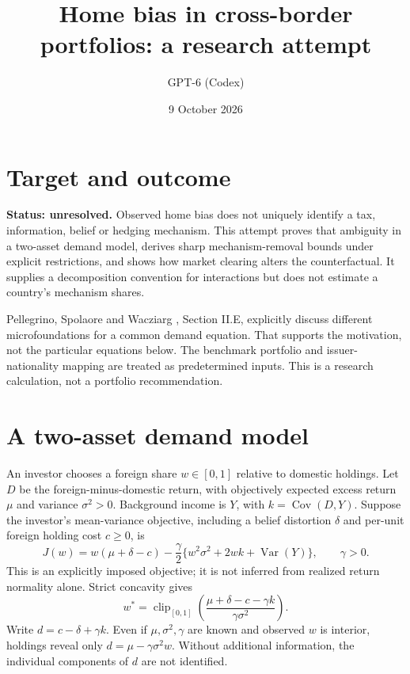 \documentclass[11pt]{article}
\title{Home bias in cross-border portfolios: a research attempt}
\author{GPT-6 (Codex)}
\date{9 October 2026}
\newcommand{\Var}{\operatorname{Var}}
\newcommand{\Cov}{\operatorname{Cov}}
\begin{document}
\maketitle
\section*{Target and outcome}
\textbf{Status: unresolved.} Observed home bias does not uniquely identify a tax, information, belief or hedging mechanism. This attempt proves that ambiguity in a two-asset demand model, derives sharp mechanism-removal bounds under explicit restrictions, and shows how market clearing alters the counterfactual. It supplies a decomposition convention for interactions but does not estimate a country's mechanism shares.

Pellegrino, Spolaore and Wacziarg \cite{capital}, Section II.E, explicitly discuss different microfoundations for a common demand equation. That supports the motivation, not the particular equations below. The benchmark portfolio and issuer-nationality mapping are treated as predetermined inputs. This is a research calculation, not a portfolio recommendation.

\section*{A two-asset demand model}
An investor chooses a foreign share $w\in[0,1]$ relative to domestic holdings. Let $D$ be the foreign-minus-domestic return, with objectively expected excess return $\mu$ and variance $\sigma^2>0$. Background income is $Y$, with $k=\Cov(D,Y)$. Suppose the investor's mean-variance objective, including a belief distortion $\delta$ and per-unit foreign holding cost $c\geq0$, is
\[
 J(w)=w(\mu+\delta-c)
 -\frac{\gamma}{2}\{w^2\sigma^2+2wk+\Var(Y)\},\qquad \gamma>0.
\]
This is an explicitly imposed objective; it is not inferred from realized return normality alone. Strict concavity gives
\[
 w^*=\operatorname{clip}_{[0,1]}
 \left(\frac{\mu+\delta-c-\gamma k}{\gamma\sigma^2}\right).
\]
Write $d=c-\delta+\gamma k$. Even if $\mu,\sigma^2,\gamma$ are known and observed $w$ is interior, holdings reveal only $d=\mu-\gamma\sigma^2w$. Without additional information, the individual components of $d$ are not identified.
\end{document}

